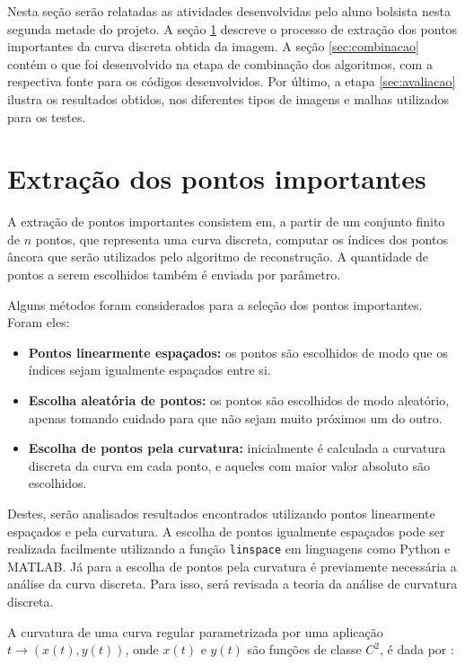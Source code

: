 Nesta seção serão relatadas as atividades desenvolvidas pelo aluno bolsista nesta segunda metade do projeto. A seção \ref{sec:extracao} descreve o processo de extração dos pontos importantes da curva discreta obtida da imagem. A seção \ref{sec:combinacao} contém o que foi desenvolvido na etapa de combinação dos algoritmos, com a respectiva fonte para os códigos desenvolvidos. Por último, a etapa \ref{sec:avaliacao} ilustra os resultados obtidos, nos diferentes tipos de imagens e malhas utilizados para os testes.

\section{Extração dos pontos importantes}\label{sec:extracao}

A extração de pontos importantes consistem em, a partir de um conjunto finito de $n$ pontos, que representa uma curva discreta, computar os índices dos pontos âncora que serão utilizados pelo algoritmo de reconstrução. A quantidade de pontos a serem escolhidos também é enviada por parâmetro.

Alguns métodos foram considerados para a seleção dos pontos importantes. Foram eles:

\begin{itemize}
    \item \textbf{Pontos linearmente espaçados:} os pontos são escolhidos de modo que os índices sejam igualmente espaçados entre si.
    \item \textbf{Escolha aleatória de pontos:} os pontos são escolhidos de modo aleatório, apenas tomando cuidado para que não sejam muito próximos um do outro.
    \item \textbf{Escolha de pontos pela curvatura:} inicialmente é calculada a curvatura discreta da curva em cada ponto, e aqueles com maior valor absoluto são escolhidos.
\end{itemize}

Destes, serão analisados resultados encontrados utilizando pontos linearmente espaçados e pela curvatura. A escolha de pontos igualmente espaçados pode ser realizada facilmente utilizando a função \texttt{linspace} em linguagens como Python e MATLAB. Já para a escolha de pontos pela curvatura é previamente necessária a análise da curva discreta. Para isso, será revisada a teoria da análise de curvatura discreta.

A curvatura de uma curva regular parametrizada por uma aplicação $t \rightarrow (x(t), y(t))$, onde $x(t)$ e $y(t)$ são funções de classe $C^2$, é dada por \cite{OliveiraMarroquim2020}:

